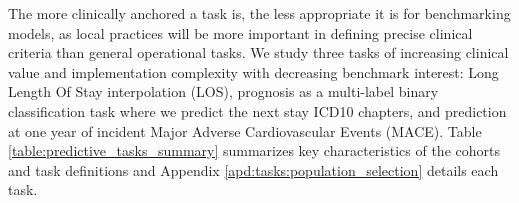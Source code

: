 \documentclass[french,12pt,twoside,a4paper]{book}
\begin{document}
The more clinically anchored a task is, the less appropriate it is for
benchmarking models, as local practices will be more important in
defining precise clinical criteria than general operational tasks. We study
three tasks of increasing clinical value and implementation complexity with
decreasing benchmark interest: Long Length Of Stay interpolation (LOS),
prognosis as a multi-label binary classification task where we predict the next
stay ICD10 chapters, and prediction at one year of incident Major Adverse
Cardiovascular Events (MACE). Table \ref{table:predictive_tasks_summary}
summarizes key characteristics of the cohorts and task definitions and Appendix
\ref{apd:tasks:population_selection} details each task.

\begin{table}[!ht]
  \centering
  \resizebox*{0.9\textwidth}{!}{

}
\end{table}
\end{document}
